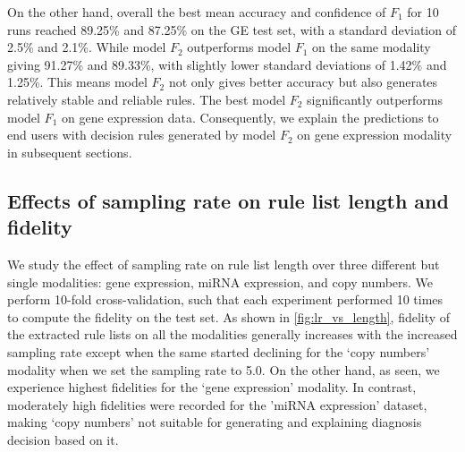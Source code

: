 \hspace*{3.5mm} On the other hand, overall the best mean accuracy and confidence of $F_1$ for 10 runs reached 89.25\% and 87.25\% on the GE test set, with a standard deviation of 2.5\% and 2.1\%. While model $F_2$ outperforms model $F_1$ on the same modality giving 91.27\% and 89.33\%, with slightly lower standard deviations of 1.42\% and 1.25\%. This means model $F_2$ not only gives better accuracy but also generates relatively stable and reliable rules. The best model $F_2$ significantly outperforms model $F_1$ on gene expression data. Consequently, we explain the predictions to end users with decision rules generated by model $F_2$ on gene expression modality in subsequent sections. 

\subsection{Effects of sampling rate on rule list length and fidelity}
We study the effect of sampling rate on rule list length over three different but single modalities: gene expression, miRNA expression, and copy numbers. We perform 10-fold cross-validation, such that each experiment performed 10 times to compute the fidelity on the test set. As shown in \cref{fig:lr_vs_length}, fidelity of the extracted rule lists on all the modalities generally increases with the increased sampling rate except when the same started declining for the `copy numbers' modality when we set the sampling rate to 5.0. On the other hand, as seen, we experience highest fidelities for the `gene expression' modality. In contrast, moderately high fidelities were recorded for the 'miRNA expression' dataset, making `copy numbers' not suitable for generating and explaining diagnosis decision based on it. 

